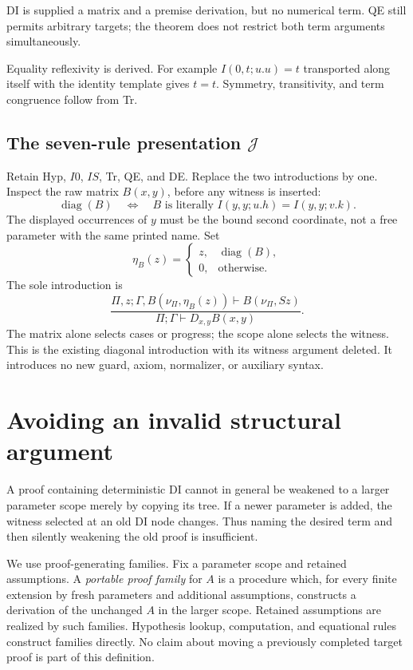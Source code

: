 \documentclass[11pt]{article}
\newcommand{\Jcal}{\mathcal J}
\newcommand{\newest}{\nu_{\Pi}}
\begin{document}
DI is supplied a matrix and a premise derivation, but no numerical term.
QE still permits arbitrary targets; the theorem does not restrict both
term arguments simultaneously.

Equality reflexivity is derived. For example \(I(0,t;u.u)=t\)
transported along itself with the identity template gives \(t=t\).
Symmetry, transitivity, and term congruence follow from Tr.

\subsection{The seven-rule presentation \texorpdfstring{\(\Jcal\)}{J}}

Retain Hyp, \(I0\), \(IS\), Tr, QE, and DE. Replace the two introductions
by one. Inspect the raw matrix \(B(x,y)\), before any witness is inserted:
\[
 \operatorname{diag}(B)
 \quad\Longleftrightarrow\quad
 B\text{ is literally }
 I(y,y;u.h)=I(y,y;v.k).
\]
The displayed occurrences of \(y\) must be the bound second coordinate,
not a free parameter with the same printed name. Set
\[
 \eta_B(z)=
 \begin{cases}
   z,&\operatorname{diag}(B),\\
   0,&\text{otherwise}.
 \end{cases}
\]
The sole introduction is
\[
 \frac{\Pi,z;\Gamma,B(\newest,\eta_B(z))
                 \vdash B(\newest,Sz)}
      {\Pi;\Gamma\vdash D_{x,y}B(x,y)}.
 \tag{DI\(^*\)}
\]
The matrix alone selects cases or progress; the scope alone selects the
witness. This is the existing diagonal introduction with its witness argument
deleted. It introduces no new guard, axiom, normalizer, or auxiliary syntax.

\section{Avoiding an invalid structural argument}\label{sec:portable}

A proof containing deterministic DI cannot in general be weakened
to a larger parameter scope merely by copying its tree. If a newer parameter
is added, the witness selected at an old DI node changes. Thus naming the
desired term and then silently weakening the old proof is insufficient.

We use proof-generating families. Fix a parameter scope and retained
assumptions. A \emph{portable proof family} for \(A\) is a procedure which,
for every finite extension by fresh parameters and additional assumptions,
constructs a derivation of the unchanged \(A\) in the larger scope.
Retained assumptions are realized by such families. Hypothesis lookup,
computation, and equational rules construct families directly.
No claim about moving a previously completed target proof is part of
this definition.
\end{document}
